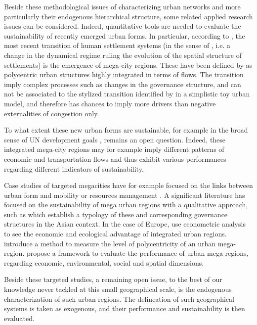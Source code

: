 \documentclass{jimis-en}
\begin{document}
Beside these methodological issues of characterizing urban networks and more particularly their endogenous hierarchical structure, some related applied research issues can be considered. Indeed, quantitative tools are needed to evaluate the sustainability of recently emerged urban forms. In particular, according to \cite{lenechet2017peupler}, the most recent transition of human settlement systems (in the sense of \cite{sanders2017peupler}, i.e. a change in the dynamical regime ruling the evolution of the spatial structure of settlements) is the emergence of mega-city regions. These have been defined by \cite{hall2006polycentric} as polycentric urban structures highly integrated in terms of flows. The transition imply complex processes such as changes in the governance structure, and can not be associated to the stylized transition identified by \cite{louf2013modeling} in a simplistic toy urban model, and therefore has chances to imply more drivers than negative externalities of congestion only.

To what extent these new urban forms are sustainable, for example in the broad sense of UN development goals \citep{komiyama2006sustainability}, remains an open question. Indeed, these integrated mega-city regions may for example imply different patterns of economic and transportation flows and thus exhibit various performances regarding different indicators of sustainability.

Case studies of targeted megacities have for example focused on the links between urban form and mobility or resources management \citep{sorensen2010megacities}. A significant literature has focused on the sustainability of mega urban regions with a qualitative approach, such as \cite{laquian2011planning} which establish a typology of these and corresponding governance structures in the Asian context. In the case of Europe, \cite{marull2013emerging} use econometric analysis to see the economic and ecological advantage of integrated urban regions. \cite{feng2018spatiotemporal} introduce a method to measure the level of polycentricity of an urban mega-region. \cite{su2017china} propose a framework to evaluate the performance of urban mega-regions, regarding economic, environmental, social and spatial dimensions.

Beside these targeted studies, a remaining open issue, to the best of our knowledge never tackled at this small geographical scale, is the endogenous characterization of such urban regions. The delineation of such geographical systems is taken as exogenous, and their performance and sustainability is then evaluated.
\end{document}
